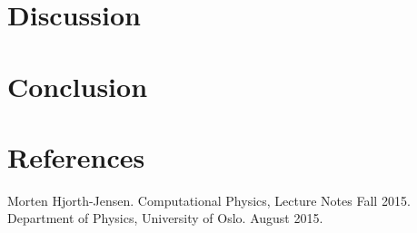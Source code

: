 \documentclass[norsk,a4paper,12pt]{article}
\begin{document}
{\section{Discussion}
\section{Conclusion}
\section{References}
\begingroup
\renewcommand{\section}[2]{}
\begin{thebibliography}{}
  Morten Hjorth-Jensen.
  Computational Physics, Lecture Notes Fall 2015.
  Department of Physics, University of Oslo.
  August 2015.
\end{thebibliography}
\endgroup
\end{document}

